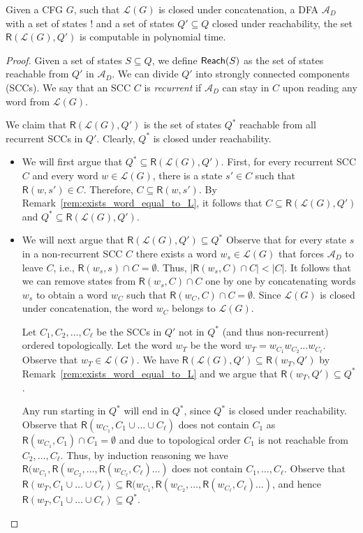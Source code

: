 \documentclass{CSML}
\newcommand{\aut}{\mathcal{A}}
\newcommand{\lang}{\mathcal{L}}
\newcommand{\R}{\textsf{R}}
\begin{document}
\begin{lem}
Given a CFG $G$, such that $\lang(G)$ is closed under concatenation, a DFA $\aut_D$ with a set of states $!$ and a set of states $Q' \subseteq Q$ closed under reachability, 
the set $\R(\lang(G), Q')$ is computable in polynomial time.
\label{l:compute-reachable-states}
\end{lem}
\begin{proof}
Given a set of states $S \subseteq Q$, we define $\textsf{Reach}(S)$ as the set of states reachable from $Q'$ in $\aut_D$.
We can divide $Q'$ into strongly connected components (SCCs). 
We say that an SCC $C$ is \emph{recurrent} if $\aut_D$ can stay in $C$ upon reading any word from $\lang(G)$.


We claim that $\R(\lang(G), Q')$ is the set of states $Q^*$ reachable from all recurrent SCCs in $Q'$. Clearly, $Q^*$ is closed under reachability.
\begin{itemize}
\item We will first argue that $Q^*\subseteq \R(\lang(G), Q')$.
First, for every recurrent SCC $C$ and every word $w \in \lang(G)$, there is a state $s' \in C$ such that 
$\R(w, s') \in C$. Therefore, $C \subseteq \R(w, s')$. By Remark~\ref{rem:exists_word_equal_to_L}, it follows that $C \subseteq \R(\lang(G), Q')$ and $Q^*\subseteq \R(\lang(G), Q')$. 

\item We will next argue that $\R(\lang(G), Q')\subseteq Q^*$
Observe that for every state $s$ in a non-recurrent SCC $C$ there exists a word $w_s \in \lang(G)$ that forces $\aut_D$ to leave $C$, i.e.,
$\R(w_s, s) \cap C =\emptyset$. Thus, $|\R(w_s, C) \cap C| < |C|$. It follows that we can remove states from $\R(w_s, C) \cap C$
one by one by concatenating words $w_s$ to obtain a word $w_C$ such that $\R(w_C, C) \cap C =\emptyset$.
Since $\lang(G)$ is closed under concatenation, the word $w_C$ belongs to $\lang(G)$.

Let $C_1,C_2,\dots, C_\ell$ be the SCCs in $Q'$ not in $Q^*$ (and thus non-recurrent) ordered topologically. Let the word $w_T$ be the word $w_T=w_{C_1}w_{C_2}\dots w_{C_\ell}$.  Observe that $w_T\in \lang(G)$. 
We have $\R(\lang(G),Q')\subseteq \R(w_T,Q')$ by Remark~\ref{rem:exists_word_equal_to_L} and we argue that $\R(w_T,Q')\subseteq Q^*$. 

Any run starting in $Q^*$ will end in $Q^*$, since $Q^*$ is closed under reachability. 
Observe that $\R(w_{C_1}, C_1 \cup \ldots \cup C_{\ell})$ does not contain $C_1$ as 
$\R(w_{C_1}, C_1) \cap C_1 = \emptyset$ and due to topological order $C_1$ is not reachable from $C_2, \ldots, C_{\ell}$.
Thus, by induction reasoning we have $\R(w_{C_1}, \R(w_{C_2}, \ldots, \R(w_{C_\ell}, C_\ell) \ldots )$ does not 
contain $C_1, \ldots, C_\ell$. Observe that 
$\R(w_T, C_1 \cup \ldots \cup C_\ell) \subseteq \R(w_{C_1}, \R(w_{C_2}, \ldots, \R(w_{C_\ell}, C_\ell) \ldots )$, 
and hence $\R(w_T, C_1 \cup \ldots \cup C_\ell) \subseteq Q^*$. 




\end{itemize}
\end{proof}
\end{document}
